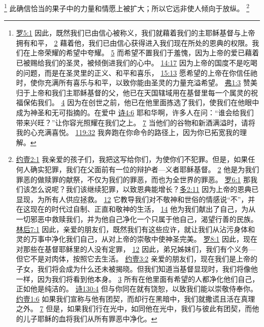 \documentclass[12pt, a4paper, oneside]{ctexart}
\begin{document}
	\footnote {
		\href{https://biblehub.com/romans/5-1.htm}{罗5:1} 因此，既然我们已由信心被称义，我们就藉着我们的主耶稣基督与上帝拥有和平，
		\href{https://biblehub.com/romans/5-2.htm}{2} 藉着他，我们已由信心获得进入我们现在所处的恩典的权限。我们在上帝荣耀的希望中夸耀。
		\href{https://biblehub.com/romans/5-5.htm}{5} 而希望不置我们于羞愧，因为上帝的爱已藉着已被赐给我们的圣灵，被倾倒进我们的心中。
		\href{https://biblehub.com/romans/14-17.htm}{14:17} 因为上帝的国度不是吃喝的问题，而是在圣灵里的正义、和平和喜乐，
		\href{https://biblehub.com/romans/15-13.htm}{15:13} 愿希望的上帝在你信任祂时，使你充满所有喜乐与和平，以致你能由圣灵的力量充溢希望。
		\href{https://biblehub.com/ephesians/1-3.htm}{弗1:3} 赞美归于上帝和我们主耶稣基督的父，他已在天国辖域用在基督里每一个属灵的祝福保佑我们。
		\href{https://biblehub.com/ephesians/1-4.htm}{4} 因为在创世之前，他已在他里面拣选了我们，使我们在他眼中成为神圣和无可指摘的。在爱中
		\href{https://biblehub.com/psalms/4-6.htm}{诗4:6} 耶和华啊，许多人在问：“谁会给我们带来兴旺？”让你容光照耀在我们之上。
		\href{https://biblehub.com/psalms/4-7.htm}{7} 当他们的谷物和新酒满溢时，请将我的心充满喜悦。
		\href{https://biblehub.com/psalms/119-32.htm}{119:32} 我奔跑在你命令的路径上，因为你已拓宽我的理解。
	}
	此确信恰当的果子中的力量和情愿上被扩大；所以它远非使人倾向于放纵。
	\footnote {
		\href{https://biblehub.com/1_john/2-1.htm}{约壹2:1} 我亲爱的孩子们，我把这写给你们，为使你们不犯罪。但是，如果任何人确实犯罪，我们在父面前有一位的辩护者---义者耶稣基督。
		\href{https://biblehub.com/1_john/2-2.htm}{2} 他是为我们罪恶的做赎罪的献祭，不仅为我们的罪恶，而也为全世界的罪恶。
		\href{https://biblehub.com/romans/6-1.htm}{罗6:1} 那我们该怎么说呢？我们该继续犯罪，以致恩典能增长？\href{https://biblehub.com/titus/2-11.htm}{多2:11} 因为上帝的恩典已显现，为所有人供应拯救。
		\href{https://biblehub.com/titus/2-12.htm}{12} 它教导我们对不敬神和世俗的情感说“不”，并在这现在的时代过自制、正直和敬神的生活，
		\href{https://biblehub.com/titus/2-14.htm}{14} 他为我们献出了自己，为从一切邪恶中救赎我们，并为他自己净化一个只属于他自己，渴望行善的民族。
		\href{https://biblehub.com/2_corinthians/7-1.htm}{林后7:1} 因此，亲爱的朋友们，既然我们有这些应许，就让我们从沾污身体和灵的万事中净化我们自己，从对上帝的崇敬中使神圣完美。
		\href{https://biblehub.com/romans/8-1.htm}{罗8:1} 因此，现在对那些在基督耶稣里的人没有定罪，
		\href{https://biblehub.com/romans/8-12.htm}{12} 因此，弟兄姊妹们，我们有个义务---但它不是对肉体，按照它去生活。
		\href{https://biblehub.com/1_john/3-2.htm}{约壹3:2} 亲爱的朋友们，现在我们是上帝的子女，我们将会成为什么还未被揭晓。但我们知道当基督显现时，我们将像他一样，因为我们将看到他本身。
		\href{https://biblehub.com/1_john/3-3.htm}{3} 所有在他里面有希望的人都净化他们自己，正如他是纯洁的。
		\href{https://biblehub.com/psalms/130-4.htm}{诗130:4} 但与你同在就有饶恕，以致我们能以崇敬侍奉你。\href{https://biblehub.com/1_john/1-6.htm}{约壹1:6} 如果我们宣称与他有团契，而却行在黑暗中，我们就撒谎且活在真理之外。
		\href{https://biblehub.com/1_john/1-7.htm}{7} 但是，如果我们行在光中，如同他在光中，我们与彼此有团契，而他的儿子耶稣的血将我们从所有罪恶中净化。
	}
\end{document}
